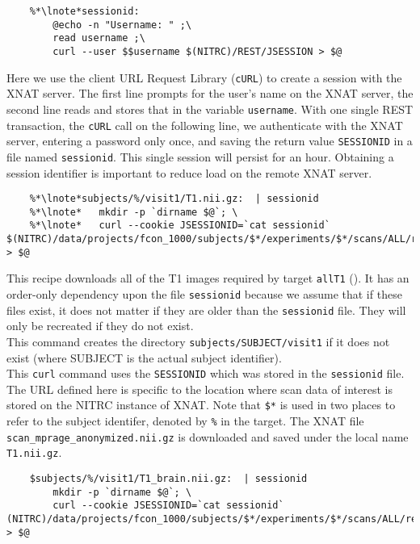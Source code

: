 \begin{lstlisting}
	%*\lnote*sessionid: 
		@echo -n "Username: " ;\
		read username ;\
		curl --user $$username $(NITRC)/REST/JSESSION > $@
\end{lstlisting}

\indent {} Here we use the client URL Request Library
(\texttt{cURL}) to create a session with the XNAT server. The first
line prompts for the user's name on the XNAT server, the second line
reads and stores that in the variable \texttt{username}. With one
single REST transaction, the \texttt{cURL} call on the following line,
we authenticate with the XNAT server, entering a password only once,
and saving the return value \texttt{SESSIONID} in a file named
\texttt{sessionid}. This single session will persist for an
hour. Obtaining a session identifier is important to reduce load on
the remote XNAT server.
	
\begin{lstlisting}	
	%*\lnote*subjects/%/visit1/T1.nii.gz:  | sessionid
	%*\lnote*	mkdir -p `dirname $@`; \
	%*\lnote*	curl --cookie JSESSIONID=`cat sessionid` $(NITRC)/data/projects/fcon_1000/subjects/$*/experiments/$*/scans/ALL/resources/NIfTI/files/scan_mprage_anonymized.nii.gz > $@

\end{lstlisting}

\indent {} This recipe downloads all of the T1 images required
by target \texttt{allT1} (). It has an order-only dependency
upon the file \texttt{sessionid} because we assume that if these files
exist, it does not matter if they are older than the
\texttt{sessionid} file. They will only be recreated if they do not
exist. \\
\indent \lnum{12} This command creates the directory
\texttt{subjects/SUBJECT/visit1} if it does not exist (where SUBJECT
is the actual subject identifier).\\
\indent \lnum{13} This \texttt{curl} command uses the
\texttt{SESSIONID} which was stored in the \texttt{sessionid}
file. The URL defined here is specific to the location where scan data
of interest is stored on the NITRC instance of XNAT. Note that
\texttt{\$*} is used in two places to refer to the subject identifer, denoted by
\texttt{\%} in the target. The XNAT file \texttt{scan_mprage_anonymized.nii.gz} is downloaded and saved under the local name \texttt{T1.nii.gz}.

\begin{lstlisting}
	$subjects/%/visit1/T1_brain.nii.gz:  | sessionid
		mkdir -p `dirname $@`; \
		curl --cookie JSESSIONID=`cat sessionid` (NITRC)/data/projects/fcon_1000/subjects/$*/experiments/$*/scans/ALL/resources/NIfTI/files/scan_mprage_skullstripped.nii.gz > $@
\end{lstlisting}

